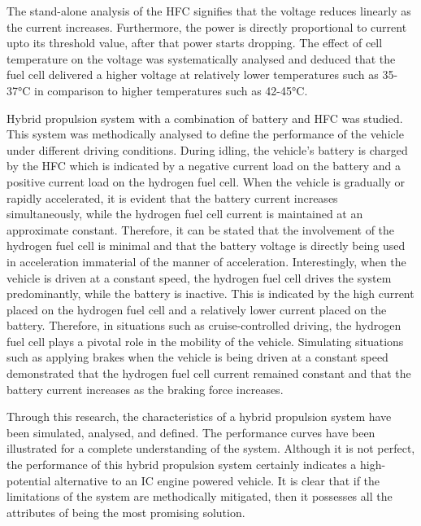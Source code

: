 \documentclass[
	a4paper, %
	10pt, %
]{LTJournalArticle}
\begin{document}
The stand-alone analysis of the HFC signifies that the voltage reduces linearly as the current increases. Furthermore, the power is directly proportional to current upto its threshold value, after that power starts dropping. The effect of cell temperature on the voltage was systematically analysed and deduced that the fuel cell delivered a higher voltage at relatively lower temperatures such as 35-37°C in comparison to higher temperatures such as 42-45°C.

Hybrid propulsion system with a combination of battery and HFC was studied. This system was methodically analysed to define the performance of the vehicle under different driving conditions. During idling, the vehicle’s battery is charged by the HFC which is indicated by a negative current load on the battery and a positive current load on the hydrogen fuel cell. When the vehicle is gradually or rapidly accelerated, it is evident that the battery current increases simultaneously, while the hydrogen fuel cell current is maintained at an approximate constant. Therefore, it can be stated that the involvement of the hydrogen fuel cell is minimal and that the battery voltage is directly being used in acceleration immaterial of the manner of acceleration. Interestingly, when the vehicle is driven at a constant speed, the hydrogen fuel cell drives the system predominantly, while the battery is inactive. This is indicated by the high current placed on the hydrogen fuel cell and a relatively lower current placed on the battery. Therefore, in situations such as cruise-controlled driving, the hydrogen fuel cell plays a pivotal role in the mobility of the vehicle. Simulating situations such as applying brakes when the vehicle is being driven at a constant speed demonstrated that the hydrogen fuel cell current remained constant and that the battery current increases as the braking force increases.

Through this research, the characteristics of a hybrid propulsion system have been simulated, analysed, and defined. The performance curves have been illustrated for a complete understanding of the system. Although it is not perfect, the performance of this hybrid propulsion system certainly indicates a high-potential alternative to an IC engine powered vehicle. It is clear that if the limitations of the system are methodically mitigated, then it possesses all the attributes of being the most promising solution.
                                               
\end{document}
